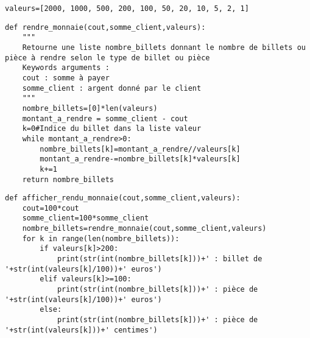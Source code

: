 \question{}
\begin{lstlisting}
valeurs=[2000, 1000, 500, 200, 100, 50, 20, 10, 5, 2, 1]
\end{lstlisting}

\question{}

\begin{lstlisting}
def rendre_monnaie(cout,somme_client,valeurs):
    """
    Retourne une liste nombre_billets donnant le nombre de billets ou pièce à rendre selon le type de billet ou pièce
    Keywords arguments :
    cout : somme à payer
    somme_client : argent donné par le client
    """
    nombre_billets=[0]*len(valeurs)
    montant_a_rendre = somme_client - cout
    k=0#Indice du billet dans la liste valeur
    while montant_a_rendre>0:
        nombre_billets[k]=montant_a_rendre//valeurs[k]
        montant_a_rendre-=nombre_billets[k]*valeurs[k]
        k+=1
    return nombre_billets
\end{lstlisting}

\question{}

\begin{lstlisting}
def afficher_rendu_monnaie(cout,somme_client,valeurs):
    cout=100*cout
    somme_client=100*somme_client
    nombre_billets=rendre_monnaie(cout,somme_client,valeurs)
    for k in range(len(nombre_billets)):
        if valeurs[k]>200:
            print(str(int(nombre_billets[k]))+' : billet de '+str(int(valeurs[k]/100))+' euros')
        elif valeurs[k]>=100:
            print(str(int(nombre_billets[k]))+' : pièce de '+str(int(valeurs[k]/100))+' euros')
        else:
            print(str(int(nombre_billets[k]))+' : pièce de '+str(int(valeurs[k]))+' centimes')
\end{lstlisting}